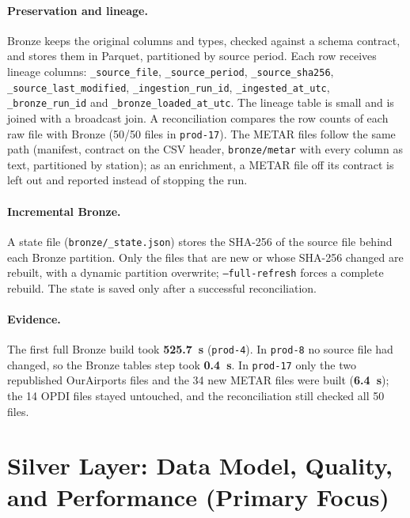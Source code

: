 \documentclass[11pt,a4paper]{article}
\begin{document}
\paragraph{Preservation and lineage.}
Bronze keeps the original columns and types, checked against a schema contract, and stores them in Parquet, partitioned by source period. Each row receives lineage columns: \texttt{\_source\_file}, \texttt{\_source\_period}, \texttt{\_source\_sha256}, \texttt{\_source\_last\_modified}, \texttt{\_ingestion\_run\_id}, \texttt{\_ingested\_at\_utc}, \texttt{\_bronze\_run\_id} and \texttt{\_bronze\_loaded\_at\_utc}. The lineage table is small and is joined with a broadcast join. A reconciliation compares the row counts of each raw file with Bronze (50/50 files in \texttt{prod-17}). The METAR files follow the same path (manifest, contract on the CSV header, \texttt{bronze/metar} with every column as text, partitioned by station); as an enrichment, a METAR file off its contract is left out and reported instead of stopping the run.

\paragraph{Incremental Bronze.}
A state file (\texttt{bronze/\_state.json}) stores the SHA-256 of the source file behind each Bronze partition. Only the files that are new or whose SHA-256 changed are rebuilt, with a dynamic partition overwrite; \texttt{--full-refresh} forces a complete rebuild. The state is saved only after a successful reconciliation.


\paragraph{Evidence.}
The first full Bronze build took \textbf{525.7~s} (\texttt{prod-4}). In \texttt{prod-8} no source file had changed, so the Bronze tables step took \textbf{0.4~s}. In \texttt{prod-17} only the two republished OurAirports files and the 34 new METAR files were built (\textbf{6.4~s}); the 14 OPDI files stayed untouched, and the reconciliation still checked all 50 files.

\section{Silver Layer: Data Model, Quality, and Performance (Primary Focus)}
\end{document}
